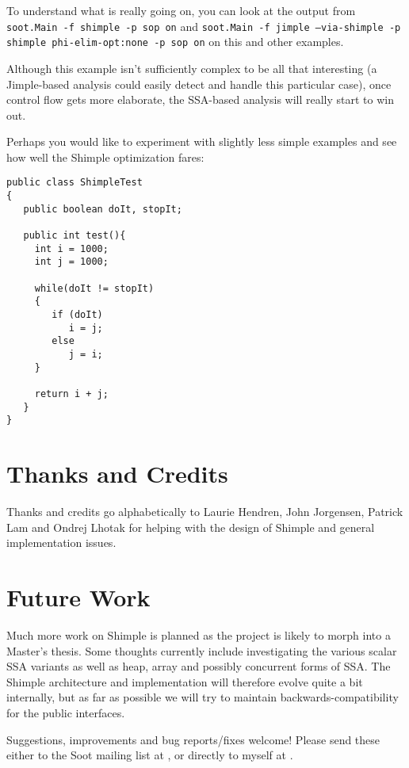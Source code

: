 \documentclass[10pt,letterpaper,oneside,onecolumn]{article}
\begin{document}
To understand what is really going on, you can look at the output from
{\tt soot.Main -f shimple -p sop on} and {\tt soot.Main -f jimple
--via-shimple -p shimple phi-elim-opt:none -p sop on} on this and
other examples.

Although this example isn't sufficiently complex to be all that
interesting (a Jimple-based analysis could easily detect and handle
this particular case), once control flow gets more elaborate, the
SSA-based analysis will really start to win out.  

Perhaps you would like to experiment with slightly less simple 
examples and see how well the Shimple optimization fares:

\begin{verbatim}
public class ShimpleTest
{
   public boolean doIt, stopIt;

   public int test(){
     int i = 1000;
     int j = 1000;

     while(doIt != stopIt)
     {
        if (doIt)
           i = j;
        else
           j = i;
     }

     return i + j;
   }
}
\end{verbatim}

\section{Thanks and Credits}

Thanks and credits go alphabetically to Laurie Hendren, John
Jorgensen, Patrick Lam and Ondrej Lhotak for helping with the design
of Shimple and general implementation issues.

\section{Future Work}

Much more work on Shimple is planned as the project is likely to morph
into a Master's thesis.  Some thoughts currently include investigating
the various scalar SSA variants as well as heap, array and possibly
concurrent forms of SSA.  The Shimple architecture and implementation
will therefore evolve quite a bit internally, but as far as possible
we will try to maintain backwards-compatibility for the public
interfaces.

Suggestions, improvements and bug reports/fixes welcome!  Please send
these either to the Soot mailing list at
, or directly to myself
at
.
\end{document}
